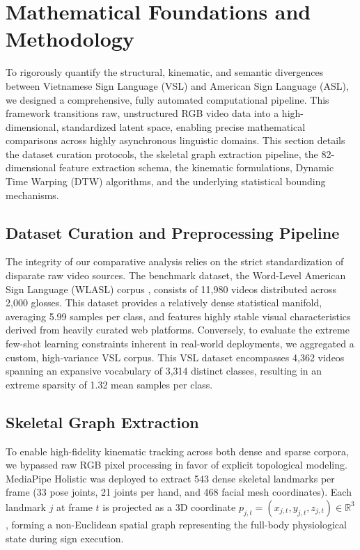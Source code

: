 \documentclass{ieeeaccess}
\begin{document}
\section{Mathematical Foundations and Methodology} 
\label{sec:methodology}
To rigorously quantify the structural, kinematic, and semantic divergences between Vietnamese Sign Language (VSL) and American Sign Language (ASL), we designed a comprehensive, fully automated computational pipeline. This framework transitions raw, unstructured RGB video data into a high-dimensional, standardized latent space, enabling precise mathematical comparisons across highly asynchronous linguistic domains. This section details the dataset curation protocols, the skeletal graph extraction pipeline, the 82-dimensional feature extraction schema, the kinematic formulations, Dynamic Time Warping (DTW) algorithms, and the underlying statistical bounding mechanisms.

\subsection{Dataset Curation and Preprocessing Pipeline} 
The integrity of our comparative analysis relies on the strict standardization of disparate raw video sources. The benchmark dataset, the Word-Level American Sign Language (WLASL) corpus \cite{li2020wlasl}, consists of 11,980 videos distributed across 2,000 glosses. This dataset provides a relatively dense statistical manifold, averaging 5.99 samples per class, and features highly stable visual characteristics derived from heavily curated web platforms. Conversely, to evaluate the extreme few-shot learning constraints inherent in real-world deployments, we aggregated a custom, high-variance VSL corpus. This VSL dataset encompasses 4,362 videos spanning an expansive vocabulary of 3,314 distinct classes, resulting in an extreme sparsity of 1.32 mean samples per class.

\subsection{Skeletal Graph Extraction}
To enable high-fidelity kinematic tracking across both dense and sparse corpora, we bypassed raw RGB pixel processing in favor of explicit topological modeling. MediaPipe Holistic was deployed to extract 543 dense skeletal landmarks per frame (33 pose joints, 21 joints per hand, and 468 facial mesh coordinates). Each landmark $j$ at frame $t$ is projected as a 3D coordinate $p_{j,t} = (x_{j,t}, y_{j,t}, z_{j,t}) \in \mathbb{R}^3$, forming a non-Euclidean spatial graph representing the full-body physiological state during sign execution.
\end{document}
